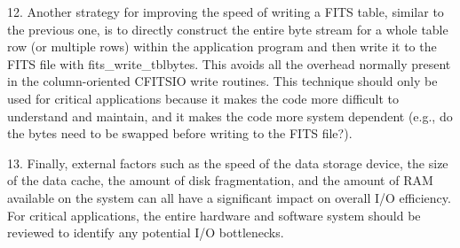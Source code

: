 \documentclass[11pt]{book}
\begin{document}
12. Another strategy for improving the speed of writing a FITS table,
similar to the previous one, is to directly construct the entire byte
stream for a whole table row (or multiple rows) within the application
program and then write it to the FITS file with
fits\_write\_tblbytes.  This avoids all the overhead normally present
in the column-oriented CFITSIO write routines.  This technique should
only be used for critical applications because it makes the code more
difficult to understand and maintain, and it makes the code more system
dependent (e.g., do the bytes need to be swapped before writing to the
FITS file?).

13.  Finally, external factors such as the speed of the data storage device,
the size of the data cache, the amount of disk fragmentation, and the amount of
RAM available on the system can all have a significant impact on
overall I/O efficiency.  For critical applications, the entire hardware
and software system should be reviewed to identify any
potential I/O bottlenecks.


\appendix
\end{document}
